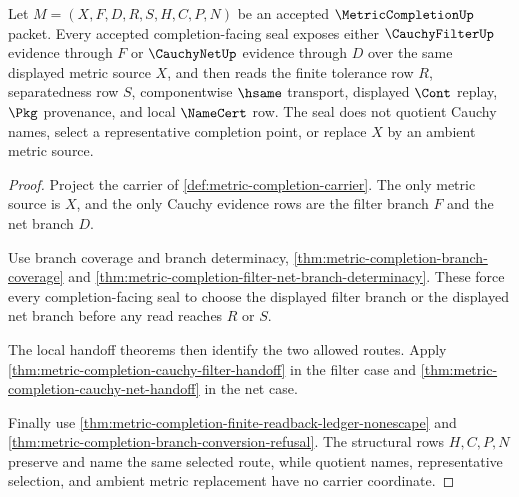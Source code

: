 \begin{theorem}
\label{thm:metriccompletion-cauchy-filter-net-seal}
Let $M=(X,F,D,R,S,H,C,P,N)$ be an accepted $\MetricCompletionUp$ packet. Every accepted completion-facing seal exposes either $\CauchyFilterUp$ evidence through $F$ or $\CauchyNetUp$ evidence through $D$ over the same displayed metric source $X$, and then reads the finite tolerance row $R$, separatedness row $S$, componentwise $\hsame$ transport, displayed $\Cont$ replay, $\Pkg$ provenance, and local $\NameCert$ row. The seal does not quotient Cauchy names, select a representative completion point, or replace $X$ by an ambient metric source.
\end{theorem}
\begin{proof}
Project the carrier of \autoref{def:metric-completion-carrier}. The only metric source is $X$, and the only Cauchy evidence rows are the filter branch $F$ and the net branch $D$.

Use branch coverage and branch determinacy, \autoref{thm:metric-completion-branch-coverage} and \autoref{thm:metric-completion-filter-net-branch-determinacy}. These force every completion-facing seal to choose the displayed filter branch or the displayed net branch before any read reaches $R$ or $S$.

The local handoff theorems then identify the two allowed routes. Apply \autoref{thm:metric-completion-cauchy-filter-handoff} in the filter case and \autoref{thm:metric-completion-cauchy-net-handoff} in the net case.

Finally use \autoref{thm:metric-completion-finite-readback-ledger-nonescape} and \autoref{thm:metric-completion-branch-conversion-refusal}. The structural rows $H,C,P,N$ preserve and name the same selected route, while quotient names, representative selection, and ambient metric replacement have no carrier coordinate.
\end{proof}

